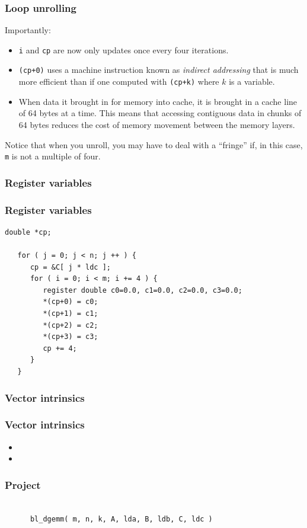 \documentclass[xcolor=pdflatex,dvipsnames,table]{beamer}
\begin{document}
\begin{frame}[fragile]
\frametitle{Loop unrolling}

Importantly:
\begin{itemize}
	\item {\tt i} and {\tt cp} are now only updates once every four iterations.
	\item {\tt *(cp+0)} uses a machine instruction known as {\em indirect addressing} that is much more efficient than if one computed with {\tt *(cp+k)} where $ k $ is a variable.
	\item
	When data it brought in for memory into cache, it is brought in a cache line of 64 bytes at a time.  This means that accessing contiguous data in chunks of 64 bytes reduces the cost of memory movement between the memory layers.
\end{itemize}
Notice that when you unroll, you may have to deal with a ``fringe'' if, in this case, {\tt m} is not a multiple of four.

\end{frame}

\subsubsection{Register variables}
\begin{frame}[fragile]
\frametitle{Register variables}

\begin{Verbatim}[frame=single]
   double *cp;

   for ( j = 0; j < n; j ++ ) {
      cp = &C[ j * ldc ];
      for ( i = 0; i < m; i += 4 ) {
         register double c0=0.0, c1=0.0, c2=0.0, c3=0.0;
         *(cp+0) = c0;
         *(cp+1) = c1;
         *(cp+2) = c2;
         *(cp+3) = c3;
         cp += 4;
      }
   }
\end{Verbatim}

\end{frame}

\subsubsection{Vector intrinsics}
\begin{frame}[fragile]
\frametitle{Vector intrinsics}
\begin{itemize}
\item {}
\item {}
\end{itemize}
\end{frame}

\begin{frame}[fragile]
\frametitle{Project}

\begin{Verbatim}[frame=single]

      bl_dgemm( m, n, k, A, lda, B, ldb, C, ldc )

\end{Verbatim}

\end{frame}
\end{document}
